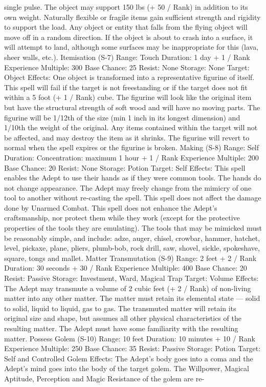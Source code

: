 \documentclass[a4paper]{article}
\begin{document}
\begin{multicols}{3}
single pulse. The object may support 150 lbs (+ 50
/ Rank) in addition to its own weight. Naturally
flexible or fragile items gain sufficient strength and
rigidity to support the load. Any object or entity
that falls from the flying object will move off in a
random direction. If the object is about to crash
into a surface, it will attempt to land, although
some surfaces may be inappropriate for this (lava,
sheer walls, etc.).
Itemisation (S-7)
Range: Touch
Duration: 1 day + 1 / Rank
Experience Multiple: 300
Base Chance: 25%
Resist: None
Storage: None
Target: Object
Effects: One object is transformed into a representative figurine of itself. This spell will fail if the
target is not freestanding or if the target does not fit
within a 5 foot (+ 1 / Rank) cube. The figurine will
look like the original item but have the structural
strength of soft wood and will have no moving
parts. The figurine will be 1/12th of the size (min 1
inch in its longest dimension) and 1/10th the
weight of the original. Any items contained within
the target will not be affected, and may destroy the
item as it shrinks. The figurine will revert to normal when the spell expires or the figurine is broken.
Making (S-8)
Range: Self
Duration: Concentration: maximum 1 hour + 1 /
Rank
Experience Multiple: 200
Base Chance: 20%
Resist: None
Storage: Potion
Target: Self
Effects: This spell enables the Adept to use their
hands as if they were common tools. The hands do
not change appearance. The Adept may freely
change from the mimicry of one tool to another
without re-casting the spell. This spell does not
affect the damage done by Unarmed Combat. This
spell does not enhance the Adept’s craftsmanship,
nor protect them while they work (except for the
protective properties of the tools they are emulating). The tools that may be mimicked must be
reasonably simple, and include: adze, auger, chisel,
crowbar, hammer, hatchet, level, pickaxe, plane,
pliers, plumb-bob, rock drill, saw, shovel, sickle,
spokeshave, square, tongs and mallet.
Matter Transmutation (S-9)
Range: 2 feet + 2 / Rank
Duration: 30 seconds + 30 / Rank
Experience Multiple: 400
Base Chance: 20%
Resist: Passive
Storage: Investment, Ward, Magical Trap
Target: Volume
Effects: The Adept may transmute a volume of 2
cubic feet (+ 2 / Rank) of non-living matter into
any other matter. The matter must retain its elemental state — solid to solid, liquid to liquid, gas
to gas. The transmuted matter will retain its original size and shape, but assumes all other physical
characteristics of the resulting matter. The Adept
must have some familiarity with the resulting matter.
Possess Golem (S-10)
Range: 10 feet
Duration: 10 minutes + 10 / Rank
Experience Multiple: 250
Base Chance: 35%
Resist: Passive
Storage: Potion
Target: Self and Controlled Golem
Effects: The Adept’s body goes into a coma and
the Adept’s mind goes into the body of the target
golem. The Willpower, Magical Aptitude, Perception and Magic Resistance of the golem are re-


\end{multicols}
\end{document}

